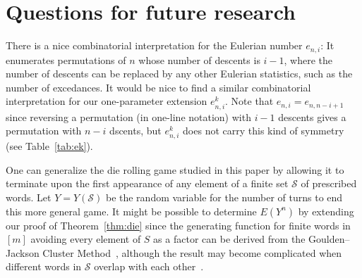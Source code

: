 \documentclass[10pt]{amsart}
\theoremstyle{definition}
\theoremstyle{remark}
\DeclareMathOperator{\overlap}{ov}
\begin{document}
\section{Questions for future research}\label{sec:questions}


There is a nice combinatorial interpretation for the Eulerian number $e_{n,i}$: It enumerates permutations of $n$ whose number of descents is $i-1$, where the number of descents can be replaced by any other Eulerian statistics, such as the number of excedances.
It would be nice to find a similar combinatorial interpretation for our one-parameter extension $e_{n,i}^k$.
Note that $e_{n,i} = e_{n,n-i+1}$ since reversing a permutation (in one-line notation) with $i-1$ descents gives a permutation with $n-i$ dscents, but $e_{n,i}^k$ does not carry this kind of symmetry (see Table~\ref{tab:ek}).



One can generalize the die rolling game studied in this paper by allowing it to terminate upon the first appearance of any element of a finite set $\mathcal{S}$ of prescribed words.
Let $Y=Y(\mathcal{S})$ be the random variable for the number of turns to end this more general game.
It might be possible to determine $E(Y^n)$ by extending our proof of Theorem~\ref{thm:die} since the generating function for finite words in $[m]$ avoiding every element of $S$ as a factor can be derived from the Goulden--Jackson Cluster Method~\cite{GJ1, GJ2}, although the result may become complicated when different words in $\mathcal{S}$ overlap with each other~\cite[examples on p.~9]{GJ3}.
\end{document}
